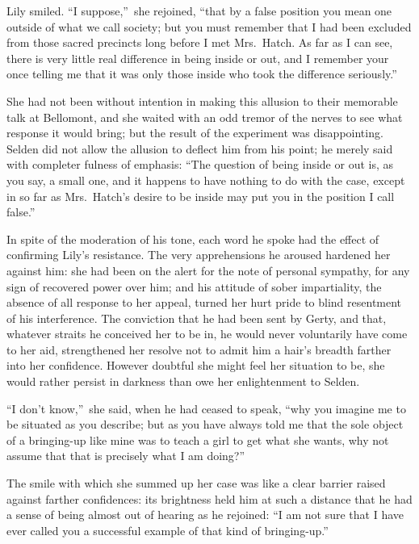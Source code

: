 \documentclass[12pt,a4paper]{book}
\begin{document}
Lily smiled. ``I suppose,''\ she rejoined, ``that by a false position
you mean one outside of what we call society; but you must
remember that I had been excluded from those sacred precincts
long before I met Mrs.\ Hatch. As far as I can see, there is very
little real difference in being inside or out, and I remember
your once telling me that it was only those inside who took the
difference seriously.''





She had not been without intention in making this allusion to
their memorable talk at Bellomont, and she waited with an odd
tremor of the nerves to see what response it would bring; but the
result of the experiment was disappointing. Selden did not allow
the allusion to deflect him from his point; he merely said with
completer fulness of emphasis: ``The question of being inside or
out is, as you say, a small one, and it happens to have nothing
to do with the case, except in so far as Mrs.\ Hatch's desire to
be inside may put you in the position I call false.''





In spite of the moderation of his tone, each word he spoke had
the effect of confirming Lily's resistance. The very
apprehensions he aroused hardened her against him: she had been
on the alert for the note of personal sympathy, for any sign of
recovered power over him; and his attitude of sober impartiality,
the absence of all response to her appeal, turned her hurt pride
to blind resentment of his interference. The conviction that he
had been sent by Gerty, and that, whatever straits he conceived
her to be in, he would never voluntarily have come to her aid,
strengthened her resolve not to admit him a hair's breadth
farther into her confidence. However doubtful she might feel her
situation to be, she would rather persist in darkness than owe
her enlightenment to Selden.





``I don't know,''\ she said, when he had ceased to speak, ``why you
imagine me to be situated as you describe; but as you
have always told me that the sole object of a bringing-up like
mine was to teach a girl to get what she wants, why not assume
that that is precisely what I am doing?''





The smile with which she summed up her case was like a clear
barrier raised against farther confidences: its brightness held
him at such a distance that he had a sense of being almost out of
hearing as he rejoined: ``I am not sure that I have ever called
you a successful example of that kind of bringing-up.''
\end{document}

